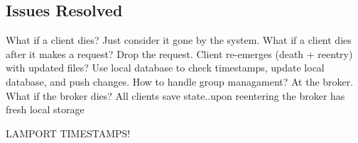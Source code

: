 {    \subsection{Issues Resolved}
    What if a client dies? Just consider it gone by the system.\newline\newline
    What if a client dies after it makes a request? Drop the request.\newline\newline
    Client re-emerges (death + reentry) with updated files? Use local database to check timestamps, update local database, and push changes.\newline\newline
    How to handle group managament? At the broker.\newline\newline
    What if the broker dies? All clients save state..upon reentering the broker has fresh local storage

    LAMPORT TIMESTAMPS!       
}

